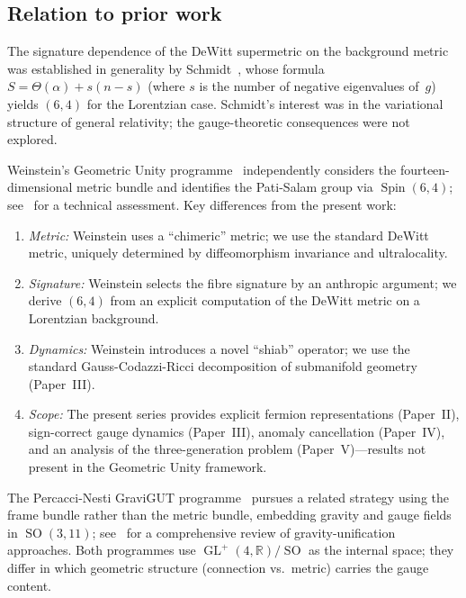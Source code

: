 \documentclass[12pt,a4paper]{article}
\theoremstyle{definition}
\newcommand{\GL}{\operatorname{GL}}
\newcommand{\SO}{\operatorname{SO}}
\newcommand{\Spin}{\operatorname{Spin}}
\newcommand{\R}{\mathbb{R}}
\begin{document}
\subsection{Relation to prior work}

The signature dependence of the DeWitt supermetric on the background metric was established in generality by Schmidt~\cite{Schmidt1989}, whose formula $S = \Theta(\alpha) + s(n-s)$ (where $s$ is the number of negative eigenvalues of~$g$) yields $(6,4)$ for the Lorentzian case.
Schmidt's interest was in the variational structure of general relativity; the gauge-theoretic consequences were not explored.

Weinstein's Geometric Unity programme~\cite{Weinstein2013,Weinstein2021} independently considers the fourteen-dimensional metric bundle and identifies the Pati-Salam group via $\Spin(6,4)$; see~\cite{NguyenPolya2021} for a technical assessment.
Key differences from the present work:

\begin{enumerate}[nosep]
\item \emph{Metric:} Weinstein uses a ``chimeric'' metric; we use the standard DeWitt metric, uniquely determined by diffeomorphism invariance and ultralocality.
\item \emph{Signature:} Weinstein selects the fibre signature by an anthropic argument; we derive $(6,4)$ from an explicit computation of the DeWitt metric on a Lorentzian background.
\item \emph{Dynamics:} Weinstein introduces a novel ``shiab'' operator; we use the standard Gauss-Codazzi-Ricci decomposition of submanifold geometry (Paper~III).
\item \emph{Scope:} The present series provides explicit fermion representations (Paper~II), sign-correct gauge dynamics (Paper~III), anomaly cancellation (Paper~IV), and an analysis of the three-generation problem (Paper~V)---results not present in the Geometric Unity framework.
\end{enumerate}

The Percacci-Nesti GraviGUT programme~\cite{PercacciNesti2010} pursues a related strategy using the frame bundle rather than the metric bundle, embedding gravity and gauge fields in $\SO(3,11)$; see~\cite{KrasnovPercacci2018} for a comprehensive review of gravity-unification approaches.
Both programmes use $\GL^+(4,\R)/\SO$ as the internal space; they differ in which geometric structure (connection vs.\ metric) carries the gauge content.
\end{document}
